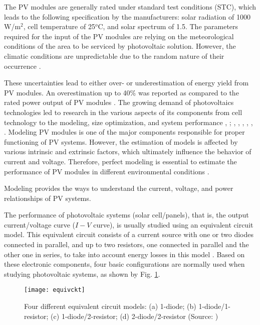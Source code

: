 The PV modules are generally rated under standard test conditions (STC), which leads to the following specification by the manufacturers:  solar radiation of 1000 W/m$^{2}$, cell temperature of 25$^{o}$C, and solar spectrum of 1.5. The parameters required for the input of the PV modules are relying on the meteorological conditions of the area to be serviced by photovoltaic solution. However, the climatic conditions are unpredictable due to the random nature of their occurrence \cite{Jakhrani}.
 
These uncertainties lead to either over- or underestimation of energy yield from PV modules. An overestimation up to 40\% was reported as compared to the rated power output of PV modules \cite{Durisch}. The growing demand of photovoltaics technologies led to research in the various aspects of its components from cell technology to the modeling, size optimization, and system performance \cite{Rajanna}, \cite{Badejani}; \cite{Yatimi}, \cite{Ferrari}, \cite{Saloux}, \cite{Hasan}, \cite{King}, \cite{Mellit}. Modeling PV modules is one of the major components responsible for proper functioning of PV systems. However, the estimation of models is affected by various intrinsic and extrinsic factors, which ultimately influence the behavior of current and voltage. Therefore, perfect modeling is essential to estimate the performance of PV modules in different environmental conditions \cite{Jakhrani}.
 
Modeling provides the ways to understand the current, voltage, and power relationships of PV systems.
  
The performance of photovoltaic systems (solar cell/panels), that is, the output current/voltage curve ($I-V$ curve), is usually studied using an equivalent circuit model. This equivalent circuit consists of a current source with one or two diodes connected in parallel, and up to two resistors, one connected in parallel and the other one in series, to take into account energy losses in this model \cite{Cubas}. Based on these electronic components, four basic configurations are normally used when studying photovoltaic systems, as shown by Fig. \ref{fig:equivckt}. 

\begin{figure}[h]
\texttt{[image: equivckt]}
\centering
\caption{Four different equivalent circuit models: (a) 1-diode; (b) 1-diode/1-resistor; (c) 1-diode/2-resistor; (d) 2-diode/2-resistor (Source: \cite{Cubas})}
\label{fig:equivckt}
\end{figure}
 
